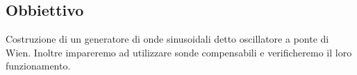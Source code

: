 \subsection{Obbiettivo}

Costruzione di un generatore di onde sinusoidali detto oscillatore a ponte di Wien. Inoltre impareremo ad utilizzare sonde compensabili e verificheremo il loro funzionamento. 
